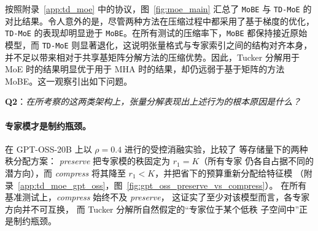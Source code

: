 \documentclass[11pt]{article}
\begin{document}
\begin{mainpart}
按照附录~\ref{app:td_moe} 中的协议，图~\ref{fig:moe_main} 汇总了 \texttt{MoBE} 与 \texttt{TD-MoE} 的对比结果。令人意外的是，尽管两种方法在压缩过程中都采用了基于梯度的优化，\texttt{TD-MoE} 的表现却明显逊于 \texttt{MoBE}。在所有测试的压缩率下，\texttt{MoBE} 都保持接近原始模型，而 \texttt{TD-MoE} 则显著退化，这说明张量格式与专家索引之间的结构对齐本身，并不足以带来相对于共享基矩阵分解方法的压缩优势。因此，Tucker 分解用于 MoE 时的结果明显优于用于 MHA 时的结果，却仍远弱于基于矩阵的方法 MoBE。这一观察引出如下问题。

\begin{tcolorbox}
    \textbf{Q2}：\textit{在所考察的这两类架构上，张量分解表现出上述行为的根本原因是什么？}
\end{tcolorbox}

\paragraph{专家模才是制约瓶颈。}
在 GPT-OSS-20B 上以 $\rho = 0.4$ 进行的受控消融实验，比较了
等存储量下的两种秩分配方案：
\emph{preserve} 把专家模的秩固定为 $r_1 = K$（所有专家
仍各自占据不同的潜方向），而 \emph{compress} 将其降至
$r_1 < K$，并把省下的预算重新分配给特征模
（附录~\ref{app:td_moe_gpt_oss}，图~\ref{fig:gpt_oss_preserve_vs_compress}）。
在所有基准测试上，\emph{compress} 始终不及 \emph{preserve}，
这证实了至少对该模型而言，各专家方向并不可互换，
而 Tucker 分解所自然假定的``专家位于某个低秩
子空间中''正是制约瓶颈。
 
 

\end{mainpart}
\end{document}
